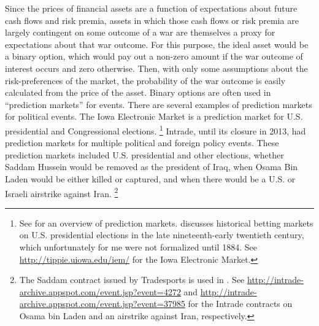 Since the prices of financial assets are a function of expectations about future cash flows and risk premia, assets in which those cash flows or risk premia are largely contingent on some outcome of a war are themselves a proxy for expectations about that war outcome.
For this purpose, the ideal asset would be a binary option, which would pay out a non-zero amount if the war outcome of interest occurs and zero otherwise.
Then, with only some assumptions about the risk-preferences of the market, the probability of the war outcome is easily calculated from the price of the asset.
Binary options are often used in ``prediction markets'' for events.
There are several examples of prediction markets for political events.
The  Iowa Electronic Market is a prediction market for U.S. presidential and Congressional elections.%
\footnote{
  See \textcite{WolfersZitzewitz2004} for an overview of prediction markets.
  \textcite{RhodeStrumpf2004a} discusses historical betting markets on U.S. presidential elections in the late nineteenth-early twentieth century, which unfortunately for me were not formalized until 1884.
  See \url{http://tippie.uiowa.edu/iem/} for the Iowa Electronic Market.
}
Intrade, until its closure in 2013, had prediction markets for multiple political and foreign policy events.
These prediction markets included U.S. presidential and other elections, whether Saddam Hussein would be removed as the president of Iraq, when Osama Bin Laden would be either killed or captured, and when there would be a U.S. or Israeli airstrike against Iran.%
\footnote{
  The Saddam contract issued by Tradesports is used in \textcite{LeighWolfersEtAl2003}.
  See \url{http://intrade-archive.appspot.com/event.jsp?event=4272} and \url{http://intrade-archive.appspot.com/event.jsp?event=37985} for the Intrade contracts on Osama bin Laden and an airstrike against Iran, respectively.
}

